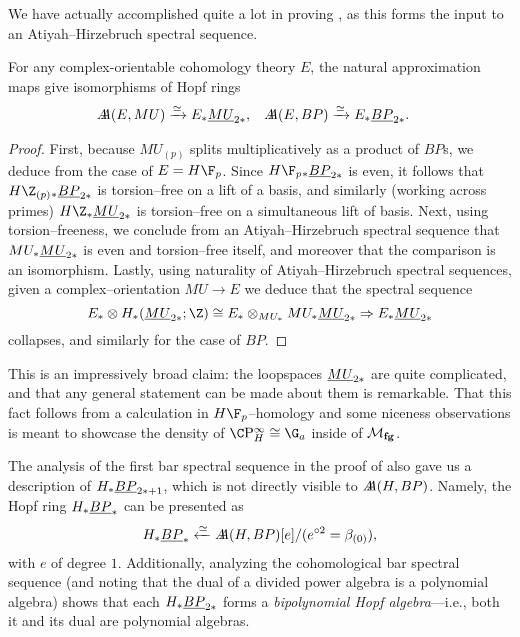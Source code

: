 We have actually accomplished quite a lot in proving , as this forms the input to an Atiyah--Hirzebruch spectral sequence.

\begin{corollary}\label{HopfRingForEBP}
For any complex-orientable cohomology theory $E$, the natural approximation maps give isomorphisms of Hopf rings
\begin{align*}
\AA(E, MU)  & \xrightarrow{\simeq} E_* \OS{MU}{2*}, &
\AA(E, BP) & \xrightarrow{\simeq} E_* \OS{BP}{2*}.
\end{align*}
\end{corollary}
\begin{proof}
First, because $MU_{(p)}$ splits multiplicatively as a product of $BP$s, we deduce from  the case of $E = H\F_p$.  Since $H\F_p{}_* \OS{BP}{2*}$ is even, it follows that $H\Z_{(p)}{}_* \OS{BP}{2*}$ is torsion--free on a lift of a basis, and similarly (working across primes) $H\Z_* \OS{MU}{2*}$ is torsion--free on a simultaneous lift of basis.  Next, using torsion--freeness, we conclude from an Atiyah--Hirzebruch spectral sequence that $MU_* \OS{MU}{2*}$ is even and torsion--free itself, and moreover that the comparison is an isomorphism.  Lastly, using naturality of Atiyah--Hirzebruch spectral sequences, given a complex--orientation $MU \to E$ we deduce that the spectral sequence \[E_* \otimes H_*(\OS{MU}{2*}; \Z) \cong E_* \otimes_{MU_*} MU_* \OS{MU}{2*} \Rightarrow E_* \OS{MU}{2*}\] collapses, and similarly for the case of $BP$.
\end{proof}

This is an impressively broad claim: the loopspaces $\OS{MU}{2*}$ are quite complicated, and that any general statement can be made about them is remarkable.  That this fact follows from a calculation in $H\F_p$--homology and some niceness observations is meant to showcase the density of $\CP^\infty_H \cong \G_a$ inside of $\moduli{fg}$.

\begin{remark}
The analysis of the first bar spectral sequence in the proof of  also gave us a description of $H_* \OS{BP}{2*+1}$, which is not directly visible to $\AA(H, BP)$.  Namely, the Hopf ring $H_* \OS{BP}{*}$ can be presented as \[H_* \OS{BP}{*} \xleftarrow{\simeq} \AA(H, BP)[e] / (e^{\circ 2} = \beta_{(0)}),\] with $e$ of degree $1$.  Additionally, analyzing the cohomological bar spectral sequence (and noting that the dual of a divided power algebra is a polynomial algebra) shows that each $H_* \OS{BP}{2*}$ forms a \textit{bipolynomial Hopf algebra}---i.e., both it and its dual are polynomial algebras.
\end{remark}

